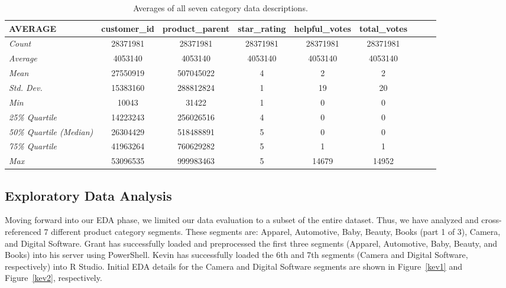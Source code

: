 \documentclass[10pt, conference, compsocconf]{IEEEtran}
\begin{document}
\begin{center}
	\begin{table*}[!]
		\centering \footnotesize
		\vspace{0.01cm}
		\caption{Averages of all seven category data descriptions.}
		\hspace{1cm}
		\begin{tabular}{| l | c | c | c | c | c | c | c | c |}
			\hline
			\textbf{AVERAGE} & \textbf{customer\_id}	& \textbf{product\_parent}	& \textbf{star\_rating}	& \textbf{helpful\_votes}& 	\textbf{total\_votes} \\ \hline
			
			\textit{Count} & 28371981 &	28371981 &	28371981 &	28371981 &	28371981 \\ \hline
			\textit{Average} & 4053140 &	4053140 &	4053140 &	4053140 &	4053140  \\ \hline
			\textit{Mean} & 27550919 &	507045022&	4&	2&	2	 \\ \hline
			\textit{Std. Dev.} & 15383160&	288812824&	1	&19	&20	 \\ \hline
			\textit{Min} &10043&	31422&	1&	0&	0	\\ \hline
			\textit{25\% Quartile} & 14223243&	256026516	&4&	0&	0	 \\ \hline
			\textit{50\% Quartile (Median)} & 	26304429&	518488891&	5&	0&	0	 \\ \hline
			\textit{75\% Quartile} & 41963264&	760629282&	5&	1&	1	\\ \hline
			\textit{Max} & 53096535&	999983463&	5&	14679&	14952 \\ \hline
		\end{tabular}\newline
		\vspace{-0.05cm}
		\label{Table1}
	\end{table*} \hfil
\end{center} %

\subsection{Exploratory Data Analysis}\label{eda} 

Moving forward into our EDA phase, we limited our data evaluation to a subset of the entire dataset. Thus, we have analyzed and cross-referenced 7 different product category segments. These segments are: Apparel, Automotive, Baby, Beauty, Books (part 1 of 3), Camera, and Digital Software. Grant has successfully loaded and preprocessed the first three segments (Apparel, Automotive, Baby, Beauty, and Books) into his server using PowerShell. Kevin has successfully loaded the 6th and 7th segments (Camera and Digital Software, respectively) into R Studio. Initial EDA details for the Camera and Digital Software segments are shown in Figure~\ref{kev1} and Figure~\ref{kev2}, respectively. 
\end{document}
